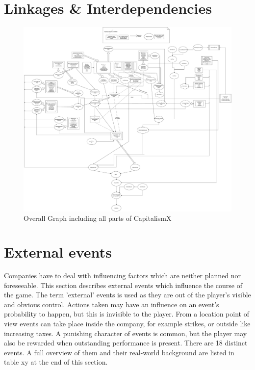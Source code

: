 \documentclass[11pt,titlepage,oneside,openany]{book}
\begin{document}



\section{Linkages \& Interdependencies}
\label{sec:link}
\begin{landscape}
\begin{figure}
    \centering
    \includegraphics[scale = 0.26]{images/Tree-like-thing.pdf}
    \caption{Overall Graph including all parts of CapitalismX}
    \label{fig:OverallGraph}
\end{figure}
\end{landscape}

\section{External events}
\label{sec:ectEvent}
Companies have to deal with influencing factors which are neither planned nor foreseeable\cite{Campbell}. This section describes external events which influence the course of the game. The term 'external' events is used as they are out of the player's visible and obvious control. Actions taken may have an influence on an event's probability to happen, but this is invisible to the player. From a location point of view events can take place inside the company, for example strikes, or outside like increasing taxes. A punishing character of events is common, but the player may also be rewarded when outstanding performance is present. There are 18 distinct events. A full overview of them and their real-world background are listed in table xy at the end of this section. \\ 
\end{document}

